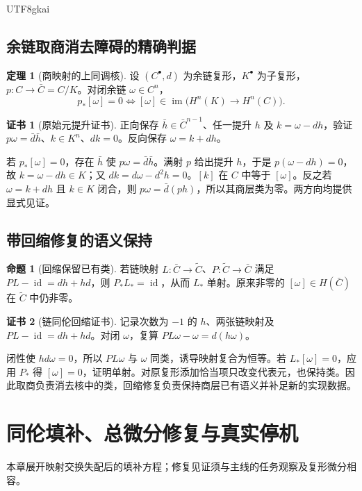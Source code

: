 \documentclass[12pt]{report}
\makeatletter
\theoremstyle{definition}
\newtheorem{theorem}{定理}[chapter]
\newtheorem{proposition}{命题}[chapter]
\newtheorem{Certificate}{证书}[chapter]
\renewenvironment{proof}[1][\proofname]{\par
  \pushQED{\qed}\normalfont
  \topsep6\p@\@plus6\p@\relax
  \trivlist
  \item[\hskip\labelsep\normalfont #1\@addpunct{.}]\ignorespaces
}{
  \popQED\endtrivlist\@endpefalse
}
\newcommand{\id}{\operatorname{id}}
\newcommand{\im}{\operatorname{im}}
\makeatother
\begin{document}
\begin{CJK*}{UTF8}{gkai}
\section{余链取商消去障碍的精确判据}
\begin{theorem}[商映射的上同调核]
\label{thm:cohkernel}
设 \((C^\bullet,d)\) 为余链复形，\(K^\bullet\) 为子复形，\(p:C\to\bar C=C/K\)。对闭余链 \(\omega\in C^n\)，
\[
p_*[\omega]=0\iff[\omega]\in\im\bigl(H^n(K)\to H^n(C)\bigr).
\]
\end{theorem}
\begin{Certificate}[原始元提升证书]
正向保存 \(\bar h\in\bar C^{n-1}\)、任一提升 \(h\) 及 \(k=\omega-dh\)，验证
\(p\omega=\bar d\bar h\)、\(k\in K^n\)、\(dk=0\)。反向保存 \(\omega=k+dh\)。
\end{Certificate}
\begin{proof}
若 \(p_*[\omega]=0\)，存在 \(\bar h\) 使 \(p\omega=\bar d\bar h\)。满射 \(p\) 给出提升 \(h\)，于是 \(p(\omega-dh)=0\)，故 \(k=\omega-dh\in K\)；又 \(dk=d\omega-d^2h=0\)。\([k]\) 在 \(C\) 中等于 \([\omega]\)。反之若 \(\omega=k+dh\) 且 \(k\in K\) 闭合，则 \(p\omega=\bar d(ph)\)，所以其商层类为零。两方向均提供显式见证。
\end{proof}

\section{带回缩修复的语义保持}
\begin{proposition}[回缩保留已有类]
\label{prop:retract}
若链映射 \(L:\bar C\to\widetilde C\)、\(P:\widetilde C\to\bar C\) 满足
\(PL-\id=dh+hd\)，则 \(P_*L_*=\id\)，从而 \(L_*\) 单射。原来非零的 \([\omega]\in H(\bar C)\) 在 \(\widetilde C\) 中仍非零。
\end{proposition}
\begin{Certificate}[链同伦回缩证书]
记录次数为 \(-1\) 的 \(h\)、两张链映射及 \(PL-\id=dh+hd\)。对闭 \(\omega\)，复算 \(PL\omega-\omega=d(h\omega)\)。
\end{Certificate}
\begin{proof}
闭性使 \(hd\omega=0\)，所以 \(PL\omega\) 与 \(\omega\) 同类，诱导映射复合为恒等。若 \(L_*[\omega]=0\)，应用 \(P_*\) 得 \([\omega]=0\)，证明单射。对原复形添加恰当项只改变代表元，也保持类。因此取商负责消去核中的类，回缩修复负责保持商层已有语义并补足新的实现数据。
\end{proof}

\chapter{同伦填补、总微分修复与真实停机}
\label{sec:repair}
本章展开映射交换失配后的填补方程；修复见证须与主线的任务观察及复形微分相容。

\end{CJK*}
\end{document}

